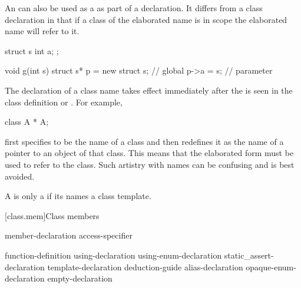 \pnum
{}%
%
\begin{note}
An  can also
be used as a  as part of a declaration. It
differs from a class declaration in that if a class of the elaborated
name is in scope the elaborated name will refer to it.
\end{note}
\begin{example}
\begin{codeblock}
struct s { int a; };

void g(int s) {
  struct s* p = new struct s;   // global 
  p->a = s;                     // parameter 
}
\end{codeblock}
\end{example}

\pnum
{}%
\begin{note}
The declaration of a class name takes effect immediately after the
 is seen in the class definition or
. For example,
\begin{codeblock}
class A * A;
\end{codeblock}
first specifies  to be the name of a class and then redefines
it as the name of a pointer to an object of that class. This means that
the elaborated form   must be used to refer to the
class. Such artistry with names can be confusing and is best avoided.
\end{note}

\pnum
{}%
A  is only a 
if its  names a class template.

[class.mem]{Class members}%
%

\begin{bnf}
\br
    member-declaration \br
    access-specifier \terminal{:} 
\end{bnf}

\begin{bnf}
\br
       \terminal{;}\br
    function-definition\br
    using-declaration\br
    using-enum-declaration\br
    static_assert-declaration\br
    template-declaration\br
    deduction-guide\br
    alias-declaration\br
    opaque-enum-declaration\br
    empty-declaration
\end{bnf}

